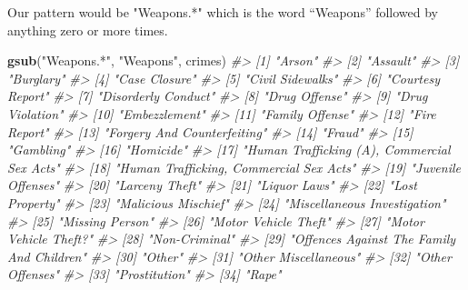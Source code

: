 \documentclass[
  12pt,
]{book}
\newenvironment{Shaded}{\begin{snugshade}}{\end{snugshade}}
\newcommand{\CommentTok}[1]{\textcolor[rgb]{0.56,0.35,0.01}{\textit{#1}}}
\newcommand{\KeywordTok}[1]{\textcolor[rgb]{0.13,0.29,0.53}{\textbf{#1}}}
\newcommand{\NormalTok}[1]{#1}
\newcommand{\StringTok}[1]{\textcolor[rgb]{0.31,0.60,0.02}{#1}}
\begin{document}
Our pattern would be "Weapons.*" which is the word ``Weapons'' followed by anything zero or more times.

\begin{Shaded}
\begin{Highlighting}[]
\KeywordTok{gsub}\NormalTok{(}\StringTok{"Weapons.*"}\NormalTok{, }\StringTok{"Weapons"}\NormalTok{, crimes)}
\CommentTok{\#>  [1] "Arson"                                     }
\CommentTok{\#>  [2] "Assault"                                   }
\CommentTok{\#>  [3] "Burglary"                                  }
\CommentTok{\#>  [4] "Case Closure"                              }
\CommentTok{\#>  [5] "Civil Sidewalks"                           }
\CommentTok{\#>  [6] "Courtesy Report"                           }
\CommentTok{\#>  [7] "Disorderly Conduct"                        }
\CommentTok{\#>  [8] "Drug Offense"                              }
\CommentTok{\#>  [9] "Drug Violation"                            }
\CommentTok{\#> [10] "Embezzlement"                              }
\CommentTok{\#> [11] "Family Offense"                            }
\CommentTok{\#> [12] "Fire Report"                               }
\CommentTok{\#> [13] "Forgery And Counterfeiting"                }
\CommentTok{\#> [14] "Fraud"                                     }
\CommentTok{\#> [15] "Gambling"                                  }
\CommentTok{\#> [16] "Homicide"                                  }
\CommentTok{\#> [17] "Human Trafficking (A), Commercial Sex Acts"}
\CommentTok{\#> [18] "Human Trafficking, Commercial Sex Acts"    }
\CommentTok{\#> [19] "Juvenile Offenses"                         }
\CommentTok{\#> [20] "Larceny Theft"                             }
\CommentTok{\#> [21] "Liquor Laws"                               }
\CommentTok{\#> [22] "Lost Property"                             }
\CommentTok{\#> [23] "Malicious Mischief"                        }
\CommentTok{\#> [24] "Miscellaneous Investigation"               }
\CommentTok{\#> [25] "Missing Person"                            }
\CommentTok{\#> [26] "Motor Vehicle Theft"                       }
\CommentTok{\#> [27] "Motor Vehicle Theft?"                      }
\CommentTok{\#> [28] "Non{-}Criminal"                              }
\CommentTok{\#> [29] "Offences Against The Family And Children"  }
\CommentTok{\#> [30] "Other"                                     }
\CommentTok{\#> [31] "Other Miscellaneous"                       }
\CommentTok{\#> [32] "Other Offenses"                            }
\CommentTok{\#> [33] "Prostitution"                              }
\CommentTok{\#> [34] "Rape"                                      }

\end{Highlighting}
\end{Shaded}
\end{document}
